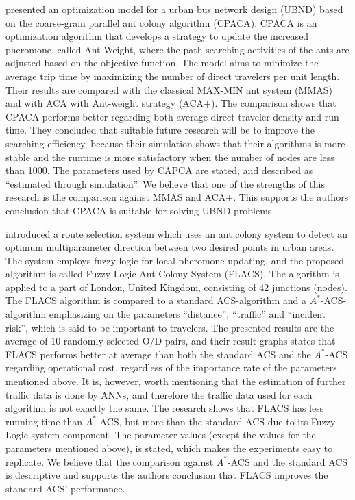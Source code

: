 \citet{yang07} presented an optimization model for a urban bus network design (UBND) based on the coarse-grain parallel ant colony algorithm (CPACA). CPACA is an optimization algorithm that develops a strategy to update the increased pheromone, called Ant Weight, where the path searching activities of the ants are adjusted based on the objective function. The model aims to minimize the average trip time by maximizing the number of direct travelers per unit length. Their results are compared with the classical MAX-MIN ant system (MMAS)\citep{stutzle99} and with ACA with Ant-weight strategy (ACA+). The comparison shows that CPACA performs better regarding both average direct traveler density and run time. They concluded that suitable future research will be to improve the searching efficiency, because their simulation shows that their algorithms is more stable and the runtime is more satisfactory when the number of nodes are less than 1000. The parameters used by CAPCA are stated, and described as ``estimated through simulation''. We believe that one of the strengths of this research is the comparison against MMAS and ACA+. This supports the authors conclusion that CPACA is suitable for solving UBND problems.   

\citet{salehinejad10} introduced a route selection system which uses an ant colony system to detect an optimum multiparameter direction between two desired points in urban areas. The system employs fuzzy logic for local pheromone updating, and the proposed algorithm is called Fuzzy Logic-Ant Colony System (FLACS). The algorithm is applied to a part of London, United Kingdom, consisting of 42 junctions (nodes). The FLACS algorithm is compared to a standard ACS-algorithm and a $A^*$-ACS-algorithm emphasizing on the parameters ``distance'', ``traffic'' and ``incident risk'', which is said to be important to travelers. The presented results are the average of 10 randomly selected O/D pairs, and their result graphs states that FLACS performs better at average than both the standard ACS and the $A^*$-ACS regarding operational cost, regardless of the importance rate of the parameters mentioned above. It is, however, worth mentioning that the estimation of further traffic data is done by ANNs, and therefore the traffic data used for each algorithm is not exactly the same. The research shows that FLACS has less running time than $A^*$-ACS, but more than the standard ACS due to its Fuzzy Logic system component. The parameter values (except the values for the parameters mentioned above), is stated, which makes the experiments easy to replicate. We believe that the comparison against $A^*$-ACS and the standard ACS is descriptive and supports the authors conclusion that FLACS improves the standard ACS' performance. 

